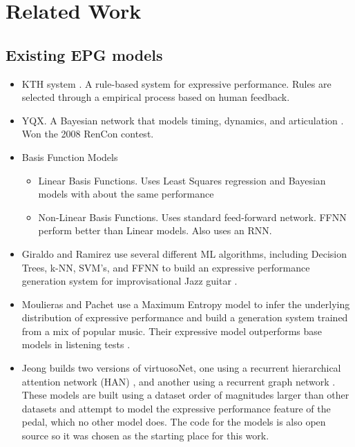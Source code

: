 \chapter{Related Work}\label{ch:ch3}

\section{Existing EPG models}
\begin{itemize}
    \item KTH system \cite{friberg2006overview}. A rule-based system for expressive performance. Rules are selected through a empirical process based on human feedback. 
    \item YQX. A Bayesian network that models timing, dynamics, and articulation \cite{widmer2009yqx}. Won the 2008 RenCon contest. 
    \item Basis Function Models \cite{eduardo2018computational}
    \begin{itemize}
        \item Linear Basis Functions. Uses Least Squares regression and Bayesian models with about the same performance
        \item Non-Linear Basis Functions. Uses standard feed-forward network. FFNN perform better than Linear models. Also uses an RNN. 
    \end{itemize}
    \item Giraldo and Ramirez use several different ML algorithms, including Decision Trees, k-NN, SVM's, and FFNN to build an expressive performance generation system for improvisational Jazz guitar \cite{giraldo2016machine}. 
    \item Moulieras and Pachet use a Maximum Entropy model to infer the underlying distribution of expressive performance and build a generation system trained from a mix of popular music. Their expressive model outperforms base models in listening tests \cite{moulieras2016maximum}. 
    \item Jeong builds two versions of virtuosoNet, one using a recurrent hierarchical attention network (HAN) \cite{jeong2019virtuosonet}, and another using a recurrent graph network \cite{jeong2019graph}. These models are built using a dataset order of magnitudes larger than other datasets and attempt to model the expressive performance feature of the pedal, which no other model does. The code for the models is also open source so it was chosen as the starting place for this work. 
\end{itemize}

